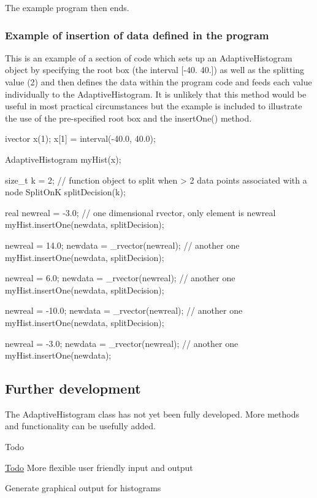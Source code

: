 \-The example program then ends.


\begin{DoxyCodeInclude}
    return 0;

} // end of Levy test program

\end{DoxyCodeInclude}
\hypertarget{AdaptiveHistograms_adhsubsec_exambyhand}{}\subsubsection{\-Example of insertion of data defined in the program}\label{AdaptiveHistograms_adhsubsec_exambyhand}
\-This is an example of a section of code which sets up an \-Adaptive\-Histogram object by specifying the root box (the interval \mbox{[}-\/40. 40.\mbox{]}) as well as the splitting value (2) and then defines the data within the program code and feeds each value individually to the \-Adaptive\-Histogram. \-It is unlikely that this method would be useful in most practical circumstances but the example is included to illustrate the use of the pre-\/specified root box and the insert\-One() method.


\begin{DoxyCode}
  ivector x(1);
  x[1] = interval(-40.0, 40.0);

  AdaptiveHistogram myHist(x);

  size_t k = 2;
  // function object to split when > 2 data points associated with a node
  SplitOnK splitDecision(k);

  real newreal = -3.0;
  // one dimensional rvector, only element is newreal
  myHist.insertOne(newdata, splitDecision);

  newreal = 14.0;
  newdata = _rvector(newreal); // another one
  myHist.insertOne(newdata, splitDecision);

  newreal = 6.0;
  newdata = _rvector(newreal); // another one
  myHist.insertOne(newdata, splitDecision);

  newreal = -10.0;
  newdata = _rvector(newreal); // another one
  myHist.insertOne(newdata, splitDecision);

  newreal = -3.0;
  newdata = _rvector(newreal); // another one
  myHist.insertOne(newdata);
\end{DoxyCode}




\hypertarget{AdaptiveHistograms_adhsec_furtherdev}{}\subsection{\-Further development}\label{AdaptiveHistograms_adhsec_furtherdev}
\-The \-Adaptive\-Histogram class has not yet been fully developed. \-More methods and functionality can be usefully added.

\begin{DoxyRefDesc}{\-Todo}
\item[\hyperlink{todo__todo000002}{\-Todo}]\-More flexible user friendly input and output 

\-Generate graphical output for histograms\end{DoxyRefDesc}
